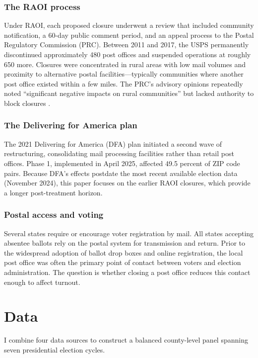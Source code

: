 \documentclass[12pt]{article}
\begin{document}
\subsubsection*{The RAOI process} Under RAOI, each proposed closure underwent a review that included community notification, a 60-day public comment period, and an appeal process to the Postal Regulatory Commission (PRC). Between 2011 and 2017, the USPS permanently discontinued approximately 480 post offices and suspended operations at roughly 650 more. Closures were concentrated in rural areas with low mail volumes and proximity to alternative postal facilities---typically communities where another post office existed within a few miles. The PRC's advisory opinions repeatedly noted ``significant negative impacts on rural communities'' but lacked authority to block closures \citep{prc2015}.

\subsubsection*{The Delivering for America plan} The 2021 Delivering for America (DFA) plan initiated a second wave of restructuring, consolidating mail processing facilities rather than retail post offices. Phase 1, implemented in April 2025, affected 49.5 percent of ZIP code pairs. Because DFA's effects postdate the most recent available election data (November 2024), this paper focuses on the earlier RAOI closures, which provide a longer post-treatment horizon.

\subsubsection*{Postal access and voting} Several states require or encourage voter registration by mail. All states accepting absentee ballots rely on the postal system for transmission and return. Prior to the widespread adoption of ballot drop boxes and online registration, the local post office was often the primary point of contact between voters and election administration. The question is whether closing a post office reduces this contact enough to affect turnout.


\section{Data}

I combine four data sources to construct a balanced county-level panel spanning seven presidential election cycles.
\end{document}
